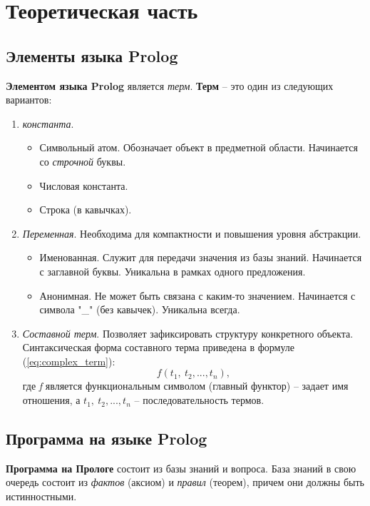 \chapter{Теоретическая часть}
\section{Элементы языка Prolog}
\textbf{Элементом языка Prolog} является \textit{терм}. \textbf{Терм} -- это один из следующих вариантов:
\begin{enumerate}
	\item \textit{константа}.
		\begin{itemize}
			\item Символьный атом. Обозначает объект в предметной области. Начинается со \textit{строчной} буквы.
			\item Числовая константа.
			\item Строка (в кавычках).
		\end{itemize}
	\item \textit{Переменная}. Необходима для компактности и повышения уровня абстракции.
		\begin{itemize}
			\item Именованная. Служит для передачи значения из базы знаний. Начинается с заглавной буквы. Уникальна в рамках одного предложения.
			\item Анонимная. Не может быть связана с каким-то значением. Начинается с символа "\_" (без кавычек). Уникальна всегда.
		\end{itemize}
	\item \textit{Составной терм}. Позволяет зафиксировать структуру конкретного объекта. Синтаксическая форма составного терма приведена в формуле (\ref{eq:complex_term}):
	\begin{equation}
		\label{eq:complex_term}
		f(t_{1},\ t_{2},...,t_{n}),
	\end{equation}
	где \textit{f} является функциональным символом (главный функтор) -- задает имя отношения, а $t_{1},\ t_{2},...,t_{n}$ -- последовательность термов. 
\end{enumerate} 

\section{Программа на языке Prolog}
\textbf{Программа на Прологе} состоит из базы знаний и вопроса. База знаний в свою очередь состоит из \textit{фактов} (аксиом) и \textit{правил} (теорем), причем они должны быть истинностными.

